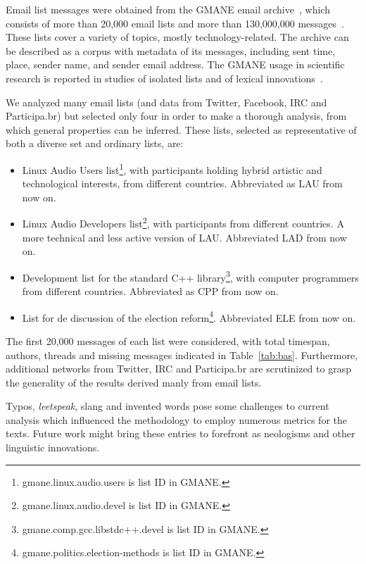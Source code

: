 \documentclass[%
 aip,
 jmp,%
 amsmath,amssymb,
 reprint,%
]{revtex4-1}
\begin{document}
Email list messages were obtained from
the GMANE email archive~\cite{gmanePack}, which consists of more than 20,000 email lists and more than 130,000,000 messages~\cite{GMANEwikipedia}. These lists cover a variety of topics, mostly technology-related. The archive can be described as a corpus with metadata of its messages, including sent time, place, sender name, and sender email address.
The GMANE usage in scientific research is reported in studies of isolated lists and of lexical innovations~\cite{GMANE2,bird}. 

We analyzed many email lists (and data from Twitter, Facebook, IRC and Participa.br) but selected only four in order to make a thorough analysis, from which general properties can be inferred. These lists, selected as representative of both a diverse set and ordinary lists, are:
\begin{itemize}
	\item Linux Audio Users list\footnote{gmane.linux.audio.users is list ID in GMANE.}, with participants holding hybrid artistic and technological interests, from different countries. Abbreviated as LAU from now on.
	\item Linux Audio Developers list\footnote{gmane.linux.audio.devel is list ID in GMANE.}, with participants from different countries. A more technical and less active version of LAU. Abbreviated LAD from now on.
	\item Development list for the standard C++ library\footnote{gmane.comp.gcc.libstdc++.devel is list ID in GMANE.}, with computer programmers from different countries. Abbreviated as CPP from now on.
	\item List for de discussion of the election reform\footnote{gmane.politics.election-methods is list ID in GMANE.}.
		Abbreviated ELE from now on.
\end{itemize} 
The first 20,000 messages of each list were considered, with total timespan, authors, threads and missing messages indicated in Table~\ref{tab:bas}.
Furthermore, additional networks from Twitter, IRC and Participa.br
are scrutinized to grasp the generality of the results derived manly from email lists.

Typos, \emph{leetspeak},
slang and invented words
pose some challenges to current analysis
which influenced the methodology to employ numerous 
metrics for the texts.
Future work might bring these entries to forefront 
as neologisms and other linguistic innovations.
\end{document}

